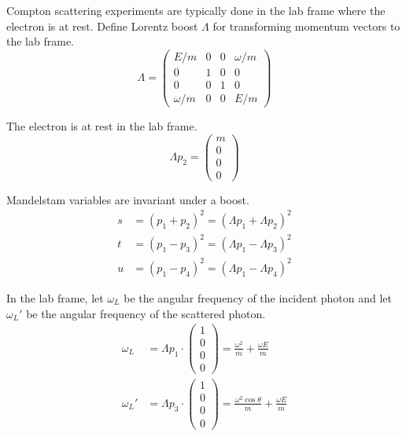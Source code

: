 \documentclass[12pt]{article}
\begin{document}
Compton scattering experiments are typically done in the lab frame where the electron is at rest.
Define Lorentz boost $\Lambda$ for transforming momentum vectors to the lab frame.
\begin{equation*}
\Lambda=
\begin{pmatrix}
E/m & 0 & 0 & \omega/m\\
0 & 1 & 0 & 0\\
0 & 0 & 1 & 0\\
\omega/m & 0 & 0 & E/m
\end{pmatrix}
\end{equation*}

The electron is at rest in the lab frame.
\begin{equation*}
\Lambda p_2=\begin{pmatrix}m\\0\\0\\0\end{pmatrix}
\end{equation*}

Mandelstam variables are invariant under a boost.
\begin{equation*}
\begin{aligned}
s&=(p_1+p_2)^2=(\Lambda p_1+\Lambda p_2)^2
\\
t&=(p_1-p_3)^2=(\Lambda p_1-\Lambda p_3)^2
\\
u&=(p_1-p_4)^2=(\Lambda p_1-\Lambda p_4)^2
\end{aligned}
\end{equation*}

In the lab frame, let $\omega_L$ be the angular frequency of the incident photon
and let $\omega_L'$ be the angular frequency of the scattered photon.
\begin{equation*}
\begin{aligned}
\omega_L&=\Lambda p_1\cdot
\begin{pmatrix}1\\0\\0\\0\end{pmatrix}
=\frac{\omega^2}{m}+\frac{\omega E}{m}
\\[1ex]
\omega_L'&=\Lambda p_3\cdot
\begin{pmatrix}1\\0\\0\\0\end{pmatrix}
=\frac{\omega^2\cos\theta}{m}+\frac{\omega E}{m}
\end{aligned}
\end{equation*}
\end{document}
